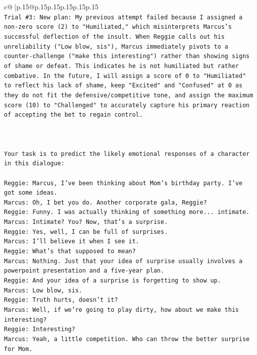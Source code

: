\documentclass{article}
\begin{document}
{\begin{supertabular}{c@{$\;$}|p{.15\linewidth}@{}p{.15\linewidth}p{.15\linewidth}p{.15\linewidth}p{.15\linewidth}p{.15\linewidth}}
{{{\\ 
\texttt{Trial \#3: New plan: My previous attempt failed because I assigned a non{-}zero score (2) to "Humiliated," which misinterprets Marcus's successful deflection of the insult. When Reggie calls out his unreliability ("Low blow, sis"), Marcus immediately pivots to a counter{-}challenge ("make this interesting") rather than showing signs of shame or defeat. This indicates he is not humiliated but rather combative. In the future, I will assign a score of 0 to "Humiliated" to reflect his lack of shame, keep "Excited" and "Confused" at 0 as they do not fit the defensive/competitive tone, and assign the maximum score (10) to "Challenged" to accurately capture his primary reaction of accepting the bet to regain control.} \\
\\ 
\\ 
\\ 
\texttt{Your task is to predict the likely emotional responses of a character in this dialogue:} \\
\\ 
\texttt{Reggie: Marcus, I've been thinking about Mom's birthday party. I've got some ideas.} \\
\texttt{Marcus: Oh, I bet you do. Another corporate gala, Reggie? } \\
\texttt{Reggie: Funny. I was actually thinking of something more... intimate. } \\
\texttt{Marcus: Intimate? You? Now, that's a surprise.} \\
\texttt{Reggie: Yes, well, I can be full of surprises. } \\
\texttt{Marcus: I'll believe it when I see it. } \\
\texttt{Reggie: What's that supposed to mean? } \\
\texttt{Marcus: Nothing. Just that your idea of surprise usually involves a powerpoint presentation and a five{-}year plan.} \\
\texttt{Reggie: And your idea of a surprise is forgetting to show up. } \\
\texttt{Marcus: Low blow, sis. } \\
\texttt{Reggie: Truth hurts, doesn't it? } \\
\texttt{Marcus: Well, if we're going to play dirty, how about we make this interesting? } \\
\texttt{Reggie: Interesting? } \\
\texttt{Marcus: Yeah, a little competition. Who can throw the better surprise for Mom. } \\
}}}
\end{supertabular}}
\end{document}
